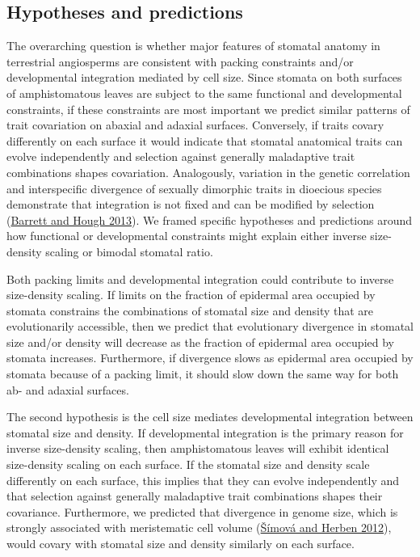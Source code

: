 \documentclass[
  12pt,
]{article}
\begin{document}
\hypertarget{hypotheses-and-predictions}{%
\subsection{Hypotheses and predictions}\label{hypotheses-and-predictions}}

The overarching question is whether major features of stomatal anatomy in terrestrial angiosperms are consistent with packing constraints and/or developmental integration mediated by cell size. Since stomata on both surfaces of amphistomatous leaves are subject to the same functional and developmental constraints, if these constraints are most important we predict similar patterns of trait covariation on abaxial and adaxial surfaces. Conversely, if traits covary differently on each surface it would indicate that stomatal anatomical traits can evolve independently and selection against generally maladaptive trait combinations shapes covariation. Analogously, variation in the genetic correlation and interspecific divergence of sexually dimorphic traits in dioecious species demonstrate that integration is not fixed and can be modified by selection (\protect\hyperlink{ref-barrett_sexual_2013}{Barrett and Hough 2013}). We framed specific hypotheses and predictions around how functional or developmental constraints might explain either inverse size-density scaling or bimodal stomatal ratio.


Both packing limits and developmental integration could contribute to inverse size-density scaling. If limits on the fraction of epidermal area occupied by stomata constrains the combinations of stomatal size and density that are evolutionarily accessible, then we predict that evolutionary divergence in stomatal size and/or density will decrease as the fraction of epidermal area occupied by stomata increases. Furthermore, if divergence slows as epidermal area occupied by stomata because of a packing limit, it should slow down the same way for both ab- and adaxial surfaces.

The second hypothesis is the cell size mediates developmental integration between stomatal size and density. If developmental integration is the primary reason for inverse size-density scaling, then amphistomatous leaves will exhibit identical size-density scaling on each surface. If the stomatal size and density scale differently on each surface, this implies that they can evolve independently and that selection against generally maladaptive trait combinations shapes their covariance. Furthermore, we predicted that divergence in genome size, which is strongly associated with meristematic cell volume (\protect\hyperlink{ref-simova_geometrical_2012}{Šímová and Herben 2012}), would covary with stomatal size and density similarly on each surface.
\end{document}
